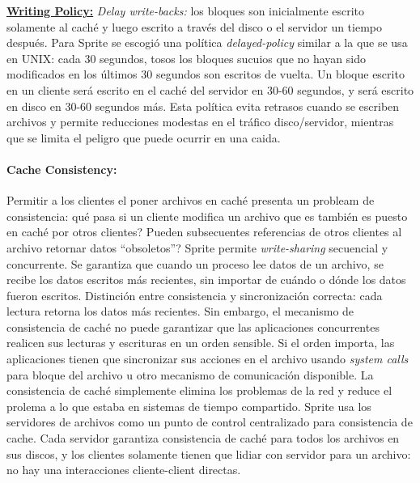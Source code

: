 \underline{\textbf{Writing Policy:}} \emph{Delay write-backs:} los bloques son inicialmente escrito solamente al caché y luego escrito a través del disco o el servidor un tiempo después. Para Sprite se escogió una política \emph{delayed-policy} similar a la que se usa en UNIX: cada 30 segundos, tosos los bloques sucuios que no hayan sido modificados en los últimos 30 segundos son escritos de vuelta. Un bloque escrito en un cliente será escrito en el caché del servidor en 30-60 segundos, y será escrito en disco en 30-60 segundos más. Esta política evita retrasos cuando se escriben archivos y permite reducciones modestas en el tráfico disco/servidor, mientras que se limita el peligro que puede ocurrir en una caida. 

\paragraph{\textnormal{\textbf{Cache Consistency:}}}
Permitir a los clientes el poner archivos en caché presenta un probleam de consistencia: qué pasa si un cliente modifica un archivo que es también es puesto en caché por otros clientes? Pueden subsecuentes referencias de otros clientes al archivo retornar datos ``obsoletos''? Sprite permite \emph{write-sharing} secuencial y concurrente. Se garantiza que cuando un proceso lee datos de un archivo, se recibe los datos escritos más recientes, sin importar de cuándo o dónde los datos fueron escritos. Distinción entre consistencia y sincronización correcta: cada lectura retorna los datos más recientes. Sin embargo, el mecanismo de consistencia de caché no puede garantizar que las aplicaciones concurrentes realicen sus lecturas y escrituras en un orden sensible. Si el orden importa, las aplicaciones tienen que sincronizar sus acciones en el archivo usando \emph{system calls} para bloque del archivo u otro mecanismo de comunicación disponible. La consistencia de caché simplemente elimina los problemas de la red y reduce el prolema a lo que estaba en sistemas de tiempo compartido. Sprite usa los servidores de archivos como un punto de control centralizado para consistencia de cache. Cada servidor garantiza consistencia de caché para todos los archivos en sus discos, y los clientes solamente tienen que lidiar con servidor para un archivo: no hay una interacciones cliente-client directas. 

